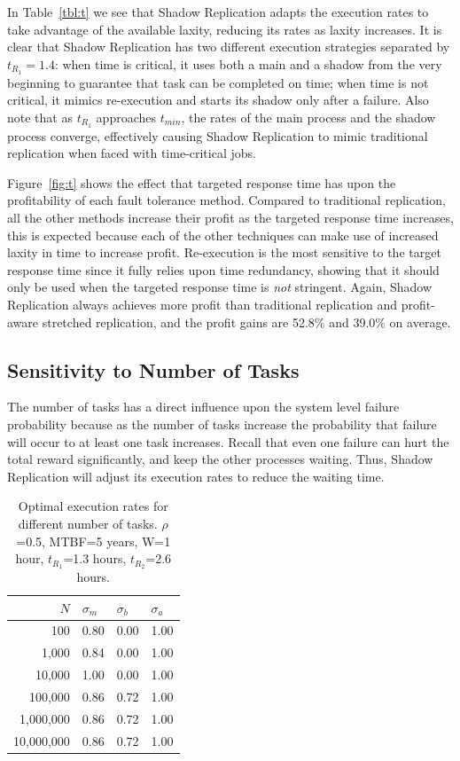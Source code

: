 In Table~\ref{tbl:t} we see that Shadow Replication adapts the execution
rates to take advantage of the available laxity, reducing its rates
as laxity increases. It is clear that Shadow Replication has two different execution strategies separated by $t_{R_1}=1.4$: when time is critical, it uses both a main and a shadow from the very beginning to guarantee that task can be completed on time; when time is not critical, it mimics re-execution and starts its shadow only after a failure.
Also note that as $t_{R_1}$
approaches $t_{min}$, the rates of the main process and the shadow process
converge, effectively causing Shadow Replication to mimic traditional
replication when faced with time-critical jobs.

Figure~\ref{fig:t} shows the effect that targeted response time has upon
the profitability of each fault tolerance method. Compared to traditional replication, all the other methods increase their profit as the targeted
response time increases, this is expected because each of the other
techniques can make use of increased laxity in time to increase
profit. Re-execution is the most sensitive to the target response
time since it fully relies upon time redundancy, showing that it should only be used when the targeted response time is \emph{not} stringent. 
Again, Shadow Replication always achieves more profit than traditional
replication and profit-aware stretched replication, and the profit
gains are 52.8\% and 39.0\% on average. 


\subsection{Sensitivity to Number of Tasks}
The number of tasks has a direct influence upon the system level
failure probability because as the number of tasks increase the
probability that failure will occur to at least one task
increases. Recall that even one failure can hurt the total reward
significantly, and keep the other processes waiting. Thus, Shadow
Replication will adjust its execution rates to reduce the waiting
time.

\begin{table}[!h]\small
	\caption{Optimal execution rates for different number of tasks. $\rho$=0.5, MTBF=5 years, W=1 hour, $t_{R_1}$=1.3 hours, $t_{R_2}$=2.6 hours.}
	\centering
		\begin{tabular}{|r|p{1cm}|p{1cm}|p{1cm}|}
		\hline
		$N$ & $\sigma_m$ & $\sigma_b$ & $\sigma_a$ \\
		\hline
		100			&	0.80	&	0.00	&	1.00 \\
		\hline
		1,000		&	0.84	&	0.00	&	1.00 \\
		\hline
		10,000		&	1.00	&	0.00	&	1.00 \\
		\hline
		100,000		&	0.86	&	0.72	&	1.00 \\
		\hline
		1,000,000		&	0.86	&	0.72	&	1.00 \\
		\hline
		10,000,000	&	0.86	&	0.72	&   1.00 \\
		\hline
		\end{tabular}
	\label{tbl:n}
\end{table}


